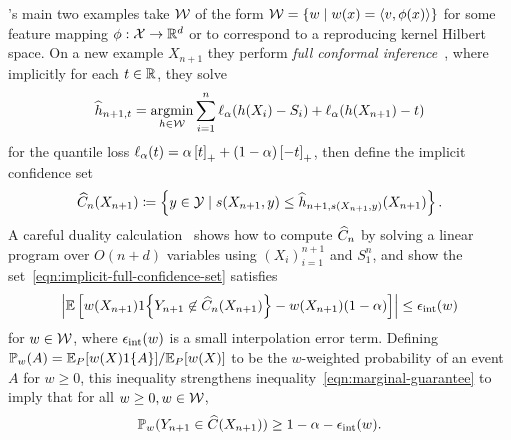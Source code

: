 \documentclass{article}
\newcommand{\loss}{\ell}
\newcommand{\scorefunc}{s}
\newcommand{\scoreval}{\scorefunc}
\newcommand{\scorerv}{S}
\begin{document}
\citeauthor{GibbsChCa23}'s main two examples take $\mathcal{W}$
of the form $\mathcal{W} = \{w \mid w(x) = \langle v,
\phi(x)\rangle\}$ for some feature mapping $\phi : \mathcal{X} \to \mathbb{R}^d$ or
to correspond to a reproducing kernel Hilbert space.
%
On a new example $X_{n + 1}$ they perform
\emph{full conformal inference}~\cite{VovkGaSh05},
where implicitly for each $t \in \mathbb{R}$, they solve
\begin{equation*}
  \what{h}_{n+1,t}
  = \argmin_{h \in \mc{W}}
  \sum_{i = 1}^n \loss_\alpha(h(X_i) - \scorerv_i)
  + \loss_\alpha(h(X_{n+1}) - t)
\end{equation*}
for the quantile loss $\loss_\alpha(t) = \alpha \hinge{t}
+ (1 - \alpha) \hinge{-t}$,
then define the implicit confidence set
\begin{equation}
  \what{C}_{n}(X_{n+1}) \defeq \left\{y \in \mc{Y}
  \mid \scoreval(X_{n + 1}, y) \le \what{h}_{n + 1, \scoreval(X_{n + 1},
    y)}(X_{n + 1}) \right\}.
  \label{eqn:implicit-full-confidence-set}
\end{equation}
A careful duality calculation~\cite[Sec.~4]{GibbsChCa23}
shows how to compute $\widehat{C}_n$ by solving a linear program
over $O(n + d)$ variables using $(X_i)_{i = 1}^{n + 1}$
and $\scorerv_1^n$,
and \citeauthor{GibbsChCa23}
show the set~\eqref{eqn:implicit-full-confidence-set}
satisfies
\begin{equation*}
  \left|\mathbb{E}\left[w(X_{n+1})1\!\left\{
      Y_{n + 1} \not \in \widehat{C}_n(X_{n+1})\right\}
    - w(X_{n + 1}) (1 - \alpha)\right]\right|
  \le \epsilon_{\textup{int}}(w)
\end{equation*}
for $w \in \mathcal{W}$, where $\epsilon_{\textup{int}}(w)$ is a small
interpolation error term.
%
Defining $\mathbb{P}_w(A) = \mathbb{E}_P[w(X)
  1\!\left\{A\right\}] / \mathbb{E}_P[w(X)]$ to be the $w$-weighted probability of an event
$A$ for $w \ge 0$, this inequality strengthens
inequality~\eqref{eqn:marginal-guarantee} to imply that
for all $w \ge 0, w \in \mathcal{W}$,
\begin{equation}
  \label{eqn:cherian-gibbs-guarantee}
  \mathbb{P}_w(Y_{n + 1} \in \widehat{C}(X_{n + 1})) \ge 1 - \alpha
  - \epsilon_{\textup{int}}(w).
\end{equation}
\end{document}
